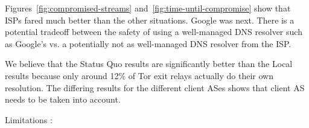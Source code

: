 Figures~\ref{fig:compromised-streams}
and~\ref{fig:time-until-compromise} show that
ISPs fared much better than the other situations. Google was next. There is a potential 
tradeoff between the safety of using a well-managed DNS resolver such as Google's vs. 
a potentially not as well-managed DNS resolver from the ISP.  

We believe that the Status Quo results are significantly better than the 
Local results because only around 12\% of Tor exit relays actually do their own resolution.
The differing results for the different client ASes shows that client AS needs to be 
taken into account. 

Limitations :


